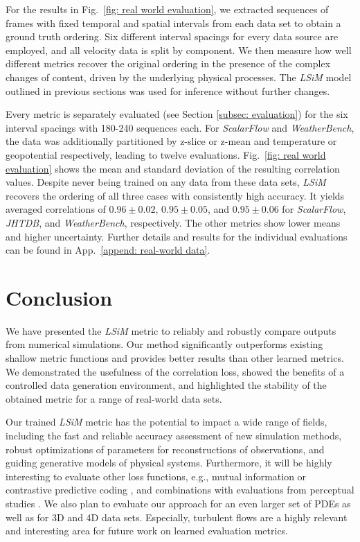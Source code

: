\documentclass{article}
\begin{document}
For the results in Fig.~\ref{fig: real world evaluation}, we extracted sequences of frames with fixed temporal and spatial intervals from each data set to obtain a ground truth ordering. Six different interval spacings for every data source are employed, and all velocity data is split by component. We then measure how well different metrics recover the original ordering in the presence of the complex changes of content, driven by the underlying physical processes. The \textit{LSiM} model outlined in previous sections was used for inference without further changes.

Every metric is separately evaluated (see Section \ref{subsec: evaluation}) for the six interval spacings with 180-240 sequences each. For \textit{ScalarFlow} and \textit{WeatherBench}, the data was additionally partitioned by z-slice or z-mean and temperature or geopotential respectively, leading to twelve evaluations. Fig.~\ref{fig: real world evaluation} shows the mean and standard deviation of the resulting correlation values.
Despite never being trained on any data from these data sets, \textit{LSiM} recovers the ordering of all three cases with consistently high accuracy. It yields averaged correlations of $0.96 \pm 0.02$, $0.95 \pm 0.05$, and $0.95 \pm 0.06$ for \textit{ScalarFlow}, \textit{JHTDB}, and \textit{WeatherBench}, respectively. The other metrics show lower means and higher uncertainty. Further details and results for the individual evaluations can be found in App.~\ref{append: real-world data}.



\section{Conclusion} \label{sec: conclusion}
We have presented the \textit{LSiM} metric to reliably and robustly compare outputs from numerical simulations. Our method significantly outperforms existing shallow metric functions and provides better results than other learned metrics. We demonstrated the usefulness of the correlation loss, showed the benefits of a controlled data generation environment, and highlighted the stability of the obtained metric for a range of real-world data sets. 

Our trained \textit{LSiM} metric has the potential to impact a wide range of fields, including the fast and reliable accuracy assessment of new simulation methods, robust optimizations of parameters for reconstructions of observations, and guiding generative models of physical systems.
Furthermore, it will be highly interesting to evaluate other loss functions, e.g., mutual information \citep{bachman2019} or contrastive predictive coding \citep{henaff2019}, and combinations with evaluations from perceptual studies \citep{um2019}. We also plan to evaluate our approach for an even larger set of PDEs as well as for 3D and 4D data sets.
Especially, turbulent flows are a highly relevant and interesting area for future work on learned evaluation metrics. 
\end{document}
